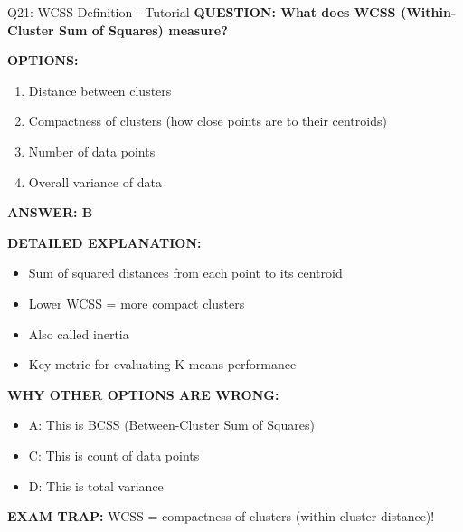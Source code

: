 \documentclass[8pt]{beamer}
\begin{document}
	\begin{frame}{Q21: WCSS Definition - Tutorial}
		\fontsize{6.5}{7.5}\selectfont
		\textbf{QUESTION: What does WCSS (Within-Cluster Sum of Squares) measure?}
		
		\vspace{0.1cm}
		\textbf{OPTIONS:}
		\begin{enumerate}
			\item Distance between clusters
			\item Compactness of clusters (how close points are to their centroids)
			\item Number of data points
			\item Overall variance of data
		\end{enumerate}
		
		\vspace{0.1cm}
		\textcolor{myblue}{\textbf{ANSWER: B}}
		
		\vspace{0.1cm}
		\textbf{DETAILED EXPLANATION:}
		\begin{itemize}
			\item Sum of squared distances from each point to its centroid
			\item Lower WCSS = more compact clusters
			\item Also called inertia
			\item Key metric for evaluating K-means performance
		\end{itemize}
		
		\vspace{0.1cm}
		\textcolor{myred}{\textbf{WHY OTHER OPTIONS ARE WRONG:}}
		\begin{itemize}
			\item \textcolor{myred}{A:} This is BCSS (Between-Cluster Sum of Squares)
			\item \textcolor{myred}{C:} This is count of data points
			\item \textcolor{myred}{D:} This is total variance
		\end{itemize}
		
		\textcolor{myred}{\textbf{EXAM TRAP:}} WCSS = \textcolor{myblue}{compactness of clusters} (within-cluster distance)!
	\end{frame}
	
\end{document}
